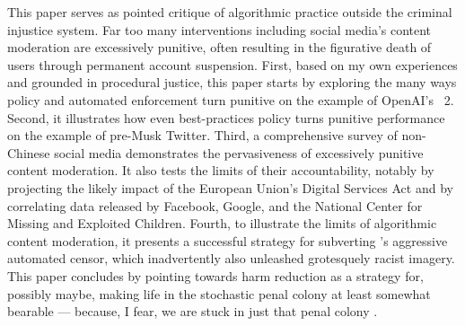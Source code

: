 This paper serves as pointed critique of algorithmic practice outside the
criminal injustice system. Far too many interventions including social media's
content moderation are excessively punitive, often resulting in the figurative
death of users through permanent account suspension. First, based on my own
experiences and grounded in procedural justice, this paper starts by exploring
the many ways policy and automated enforcement turn punitive on the example of
OpenAI's \DALLE\ 2. Second, it illustrates how even best-practices policy turns
punitive performance on the example of pre-Musk Twitter. Third, a comprehensive
survey of non-Chinese social media demonstrates the pervasiveness of excessively
punitive content moderation. It also tests the limits of their accountability,
notably by projecting the likely impact of the European Union's Digital Services
Act and by correlating data released by Facebook, Google, and the National
Center for Missing and Exploited Children. Fourth, to illustrate the limits of
algorithmic content moderation, it presents a successful strategy for subverting
\DALLE's aggressive automated censor, which inadvertently also unleashed
grotesquely racist imagery. This paper concludes by pointing towards harm
reduction as a strategy for, possibly maybe, making life in the stochastic penal
colony at least somewhat bearable --- because, I fear, we are stuck in just that
penal colony .
